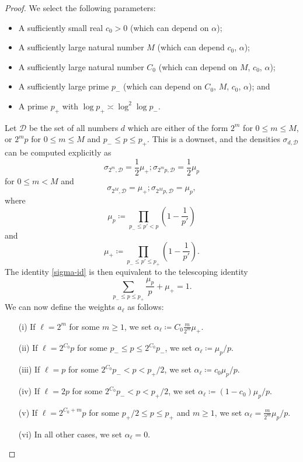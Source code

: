 \documentclass[12pt,a4paper,reqno]{amsart}
\numberwithin{equation}{section}
\theoremstyle{plain}
\theoremstyle{definition}
\begin{document}
\begin{proof}  We select the following parameters:
  \begin{itemize}
  \item A sufficiently small real $c_0>0$ (which can depend on $\alpha$);
  \item A sufficiently large natural number $M$ (which can depend $c_0$, $\alpha$);
  \item A sufficiently large natural number $C_0$ (which can depend on $M$, $c_0$, $\alpha$);
  \item A sufficiently large prime $p_-$ (which can depend on $C_0$, $M$, $c_0$, $\alpha$); and
  \item A prime $p_+$ with $\log p_+ \asymp \log^2 \log p_-$.
  \end{itemize}
Let ${\mathcal D}$ be the set of all numbers $d$ which are either of the form $2^m$ for $0 \leq m \leq M$, or $2^m p$ for $0 \leq m \leq M$ and $p_- \leq p \leq p_+$.  This is a downset, and the densities $\sigma_{d,{\mathcal D}}$ can be computed explicitly as
$$ \sigma_{2^m,{\mathcal D}} = \frac{1}{2} \mu_+; \sigma_{2^m p,{\mathcal D}} = \frac{1}{2} \mu_p$$
for $0 \leq m < M$ and
$$ \sigma_{2^M,{\mathcal D}} = \mu_+; \sigma_{2^M p,{\mathcal D}} = \mu_p,$$
where
$$ \mu_p \coloneqq \prod_{p_- \leq p' < p} \left( 1 - \frac{1}{p'} \right)$$
and
$$ \mu_+ \coloneqq \prod_{p_- \leq p' \leq p_+} \left( 1 - \frac{1}{p'} \right).$$
The identity \eqref{sigma-id} is then equivalent to the telescoping identity
\begin{equation}\label{telescope}
   \sum_{p_- \leq p \leq p_+} \frac{\mu_p}{p} + \mu_+ = 1.
\end{equation}
We can now define the weights $a_\ell$ as follows:
\begin{itemize}
\item[(i)] If $\ell = 2^m$ for some $m \geq 1$, we set $\alpha_\ell \coloneqq C_0 \frac{m}{2^m} \mu_+$.
\item[(ii)] If $\ell = 2^{C_0} p$ for some $p_- \leq p \leq 2^{C_0} p_-$, we set $\alpha_\ell \coloneqq \mu_p/p$.
\item[(iii)] If $\ell = p$ for some $2^{C_0} p_- < p < p_+/2$, we set $\alpha_\ell \coloneqq c_0 \mu_p/p$.
\item[(iv)] If $\ell = 2p$ for some $2^{C_0} p_- < p < p_+/2$, we set $\alpha_\ell \coloneqq (1-c_0) \mu_p/p$.
\item[(v)] If $\ell = 2^{C_0+m} p$ for some $p_+/2 \leq p \leq p_+$ and $m \geq 1$, we set $\alpha_\ell = \frac{m}{2^m} \mu_p/p$.
\item[(vi)] In all other cases, we set $\alpha_\ell = 0$.
\end{itemize}


\end{proof}
\end{document}
